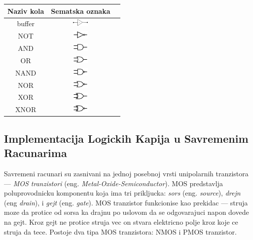 \documentclass[12p,a4paper]{article}
\begin{document}
\begin{multicols}{2}
    \begin{tabular}{*{3}{c}}
        Naziv kola & Sematska oznaka \\
        \midrule
        buffer  & \includegraphics[width=30px]{Figures/buffer.png} \\
        NOT  & \includegraphics[width=30px]{Figures/not.png} \\
        AND  & \includegraphics[width=30px]{Figures/and.png} \\
        OR   & \includegraphics[width=30px]{Figures/or.png} \\
        NAND & \includegraphics[width=30px]{Figures/nand.png} \\
        NOR  & \includegraphics[width=30px]{Figures/nor.png} \\
        XOR  & \includegraphics[width=30px]{Figures/xor.png} \\
        XNOR & \includegraphics[width=30px]{Figures/xnor.png} \\
    \end{tabular}

    \subsection{Implementacija Logickih Kapija u Savremenim Racunarima}

    Savremeni racunari su zasnivani na jednoj posebnoj vrsti unipolarnih
    tranzistora --- \emph{MOS tranzistori} 
    (eng. \emph{Metal-Oxide-Semiconductor}).
    MOS predstavlja poluprovodnicku komponentu koja ima tri prikljucka:
    \emph{sors} (eng. \emph{source}), \emph{drejn} (eng \emph{drain}), i 
    \emph{gejt} (eng. \emph{gate}).
    MOS tranzistor funkcionise kao prekidac --- struja moze da protice od 
    sorsa ka drajnu po uslovom da se odgovarajuci napon dovede na gejt.
    Kroz gejt ne protice struja vec on stvara elektricno polje kroz koje
    ce struja da tece.
    Postoje dva tipa MOS tranzistora: NMOS i PMOS tranzistor.


\end{multicols}
\end{document}
